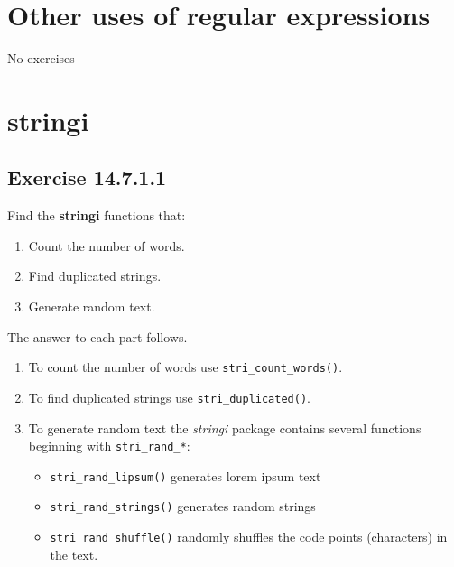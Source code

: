 \documentclass[]{book}
\providecommand{\tightlist}{%
  \setlength{\itemsep}{0pt}\setlength{\parskip}{0pt}}
\theoremstyle{plain}
\theoremstyle{remark}
\begin{document}
\hypertarget{other-uses-of-regular-expressions}{%
\section{Other uses of regular expressions}\label{other-uses-of-regular-expressions}}

No exercises

\hypertarget{stringi}{%
\section{stringi}\label{stringi}}

\hypertarget{exercise-14.7.1.1}{%
\subsection*{\texorpdfstring{Exercise {14.7.1.1}}{Exercise 14.7.1.1}}\label{exercise-14.7.1.1}}

Find the \textbf{stringi} functions that:

\begin{enumerate}
\def\labelenumi{\arabic{enumi}.}
\tightlist
\item
  Count the number of words.
\item
  Find duplicated strings.
\item
  Generate random text.
\end{enumerate}

The answer to each part follows.

\begin{enumerate}
\def\labelenumi{\arabic{enumi}.}
\item
  To count the number of words use \texttt{stri\_count\_words()}.
\item
  To find duplicated strings use \texttt{stri\_duplicated()}.
\item
  To generate random text the \emph{stringi} package contains several functions beginning with \texttt{stri\_rand\_*}:

  \begin{itemize}
  \tightlist
  \item
    \texttt{stri\_rand\_lipsum()} generates lorem ipsum text
  \item
    \texttt{stri\_rand\_strings()} generates random strings
  \item
    \texttt{stri\_rand\_shuffle()} randomly shuffles the code points (characters) in the text.
  \end{itemize}
\end{enumerate}
\end{document}
